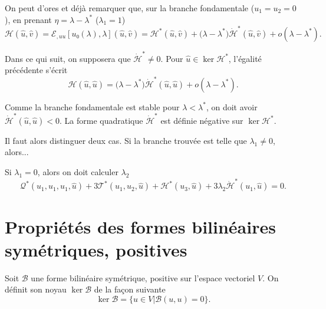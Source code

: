\documentclass[12pt, final]{amsart}
\begin{document}
On peut d'ores et déjà remarquer que, sur la branche fondamentale
(\(u_1=u_2=0\)), en prenant \(\eta=\lambda-\lambda^\ast\) (\(\lambda_1=1\))
\begin{equation}
  \mathcal H(\hat{u}, \hat{v})
  =\mathcal E_{,uu}[u₀(\lambda), \lambda](\hat{u}, \hat{v})
  =\mathcal H^\ast(\hat{u}, \hat{v})
  +\bigl(\lambda-\lambda^\ast\bigr)\dot{\mathcal H}^\ast(\hat{u}, \hat{v})
  +o(\lambda-\lambda^\ast).
\end{equation}

Dans ce qui suit, on supposera que \(\dot{\mathcal H}^\ast\neq 0\). Pour
\(\hat{u}\in\ker\mathcal H^\ast\), l'égalité précédente s'écrit
\begin{equation}
  \mathcal H(\hat{u}, \hat{u})
  =\bigl(\lambda-\lambda^\ast\bigr)\dot{\mathcal H}^\ast(\hat{u}, \hat{u})
  +o(\lambda-\lambda^\ast).
\end{equation}

Comme la branche fondamentale est stable pour \(\lambda<\lambda^\ast\), on doit
avoir \(\dot{\mathcal H}^\ast(\hat{u}, \hat{u})<0\). La forme quadratique
\(\dot{\mathcal H}^\ast\) est définie négative sur \(\ker\mathcal H^\ast\).


Il faut alors distinguer deux cas. Si la branche trouvée est telle que
\(\lambda_1\neq0\), alors...

Si \(\lambda_1=0\), alors on doit calculer \(\lambda_2\)
\begin{equation}
  \mathcal Q^\ast(u_1, u_1, u_1, \hat{u})
  +3\mathcal T^\ast(u_1, u_2, \hat{u})+\mathcal H^\ast(u_3, \hat{u})
  +3\lambda_2\dot{\mathcal H}^\ast(u_1, \hat{u})=0.
\end{equation}

\appendix

\section{Propriétés des formes bilinéaires symétriques, positives}

Soit \(\mathcal B\) une forme bilinéaire symétrique, positive sur l'espace vectoriel
\(V\). On définit son noyau \(\ker\mathcal B\) de la façon suivante
\begin{equation}
  \ker\mathcal B=\{u\in V|\mathcal B(u, u)=0\}.
\end{equation}
\end{document}
